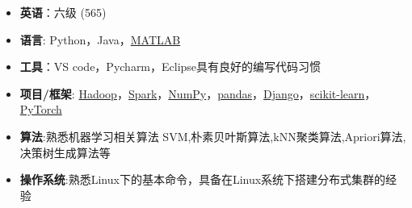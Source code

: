   \begin{itemize}[leftmargin=*]
    \item \textbf{英语}：六级 {\color{labelgrey}(565)}
    \item \textbf{语言}: Python，Java，\href{https://www.mathworks.com/}{MATLAB}
    \item \textbf{工具}：VS code，Pycharm，Eclipse具有良好的编写代码习惯 
    \item \textbf{项目/框架}: \href{http://hadoop.apache.org/}{Hadoop}，\href{http://spark.apache.org/}{Spark}，\href{http://www.numpy.org/}{NumPy}，\href{https://pandas.pydata.org/}{pandas}，\href{https://www.djangoproject.com/}{Django}，\href{http://scikit-learn.org//}{scikit-learn}，\href{https://pytorch.org/}{PyTorch}
    \item \textbf{算法}:熟悉机器学习相关算法 SVM,朴素贝叶斯算法,kNN聚类算法,Apriori算法,决策树生成算法等
    \item \textbf{操作系统}:熟悉Linux下的基本命令，具备在Linux系统下搭建分布式集群的经验 \\
  \end{itemize}
